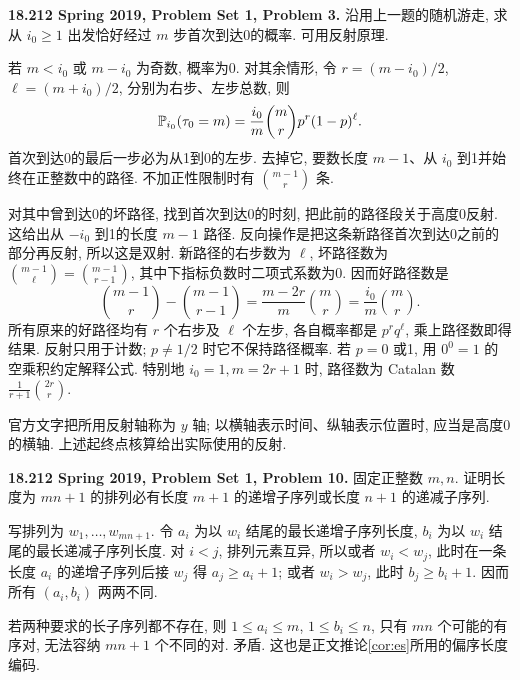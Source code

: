 \begin{exercise}\label{mit:18212-pset1-q3}
\textbf{18.212 Spring 2019, Problem Set 1, Problem 3.}
沿用上一题的随机游走, 求从 $i_0\ge1$ 出发恰好经过 $m$ 步首次到达0的概率. 可用反射原理.
\end{exercise}
\begin{solution}
若 $m<i_0$ 或 $m-i_0$ 为奇数, 概率为0. 对其余情形, 令
$r=(m-i_0)/2$, $\ell=(m+i_0)/2$, 分别为右步、左步总数, 则
\[
 \mathbb P_{i_0}(\tau_0=m)
   =\frac{i_0}{m}\binom mr p^r(1-p)^\ell.
\]
首次到达0的最后一步必为从1到0的左步. 去掉它, 要数长度 $m-1$、从 $i_0$ 到1并始终在正整数中的路径. 不加正性限制时有 $\binom{m-1}{r}$ 条.

对其中曾到达0的坏路径, 找到首次到达0的时刻, 把此前的路径段关于高度0反射. 这给出从 $-i_0$ 到1的长度 $m-1$ 路径. 反向操作是把这条新路径首次到达0之前的部分再反射, 所以这是双射. 新路径的右步数为 $\ell$, 坏路径数为
$\binom{m-1}{\ell}=\binom{m-1}{r-1}$, 其中下指标负数时二项式系数为0. 因而好路径数是
\[
 \binom{m-1}{r}-\binom{m-1}{r-1}
  =\frac{m-2r}{m}\binom mr
  =\frac{i_0}{m}\binom mr.
\]
所有原来的好路径均有 $r$ 个右步及 $\ell$ 个左步, 各自概率都是 $p^r q^\ell$, 乘上路径数即得结果. 反射只用于计数; $p\ne1/2$ 时它不保持路径概率. 若 $p=0$ 或1, 用 $0^0=1$ 的空乘积约定解释公式. 特别地 $i_0=1,m=2r+1$ 时, 路径数为 Catalan 数 $\frac1{r+1}\binom{2r}{r}$.

官方文字把所用反射轴称为 $y$ 轴; 以横轴表示时间、纵轴表示位置时, 应当是高度0的横轴. 上述起终点核算给出实际使用的反射.
\end{solution}

\begin{exercise}\label{mit:18212-pset1-q10}
\textbf{18.212 Spring 2019, Problem Set 1, Problem 10.}
固定正整数 $m,n$. 证明长度为 $mn+1$ 的排列必有长度 $m+1$ 的递增子序列或长度 $n+1$ 的递减子序列.
\end{exercise}
\begin{solution}
写排列为 $w_1,\ldots,w_{mn+1}$. 令 $a_i$ 为以 $w_i$ 结尾的最长递增子序列长度, $b_i$ 为以 $w_i$ 结尾的最长递减子序列长度. 对 $i<j$, 排列元素互异, 所以或者 $w_i<w_j$, 此时在一条长度 $a_i$ 的递增子序列后接 $w_j$ 得 $a_j\ge a_i+1$; 或者 $w_i>w_j$, 此时 $b_j\ge b_i+1$. 因而所有 $(a_i,b_i)$ 两两不同.

若两种要求的长子序列都不存在, 则 $1\le a_i\le m$, $1\le b_i\le n$, 只有 $mn$ 个可能的有序对, 无法容纳 $mn+1$ 个不同的对. 矛盾. 这也是正文推论\ref{cor:es}所用的偏序长度编码.
\end{solution}

